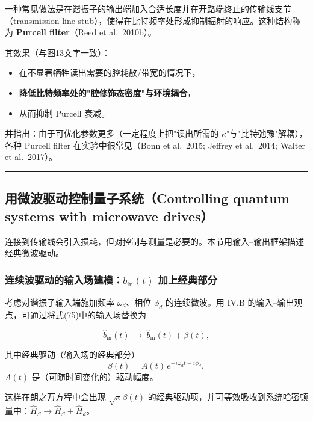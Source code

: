 \documentclass[12pt,a4paper,oneside]{ctexbook}
\begin{document}
一种常见做法是在谐振子的输出端加入合适长度并在开路端终止的传输线支节（transmission-line stub），使得在比特频率处形成抑制辐射的响应。这种结构称为 \textbf{Purcell filter}（Reed et al.\ 2010b）。

其效果（与图13文字一致）：
\begin{itemize}
  \item 在不显著牺牲读出需要的腔耗散/带宽的情况下，
  \item \textbf{降低比特频率处的"腔修饰态密度"与环境耦合}，
  \item 从而抑制 Purcell 衰减。
\end{itemize}

并指出：由于可优化参数更多（一定程度上把"读出所需的 $\kappa$"与"比特弛豫"解耦），各种 Purcell filter 在实验中很常见（Bonn et al.\ 2015; Jeffrey et al.\ 2014; Walter et al.\ 2017）。

\bigskip\hrule\bigskip

\subsection{用微波驱动控制量子系统（Controlling quantum systems with microwave drives）}

连接到传输线会引入损耗，但对控制与测量是必要的。本节用输入--输出框架描述经典微波驱动。

\subsubsection{连续波驱动的输入场建模：$b_{\mathrm{in}}(t)$ 加上经典部分}

考虑对谐振子输入端施加频率 $\omega_d$、相位 $\phi_d$ 的连续微波。用 IV.B 的输入--输出观点，可通过将式(75)中的输入场替换为

\begin{equation}
\hat b_{\mathrm{in}}(t)\ \to\ \hat b_{\mathrm{in}}(t)+\beta(t),
\end{equation}

其中经典驱动（输入场的经典部分）
\begin{equation}
\beta(t)=A(t)\,e^{-i\omega_d t-i\phi_d},
\end{equation}
$A(t)$ 是（可随时间变化的）驱动幅度。

这样在朗之万方程中会出现 $\sqrt{\kappa}\beta(t)$ 的经典驱动项，并可等效吸收到系统哈密顿量中：$\hat H_S\to \hat H_S+\hat H_d$。
\end{document}

